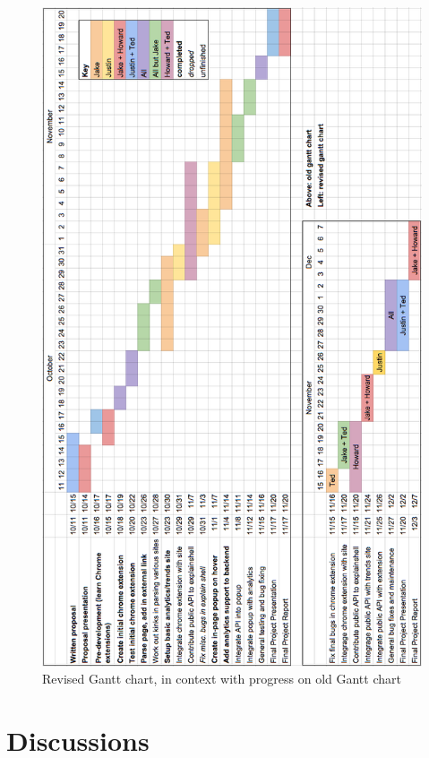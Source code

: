 \documentclass[11pt]{article}
\begin{document}
\begin{center}
  \begin{figure}[h]
    \includegraphics[height=0.95\textheight, keepaspectratio]{../../gantt-chart-revised-rotated}
    \caption{Revised Gantt chart, in context with progress on old Gantt chart}
  \end{figure}
\end{center}

\section{Discussions}
\end{document}
